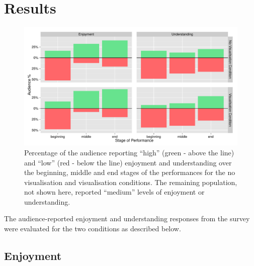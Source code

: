 \section{Results}

\begin{figure}
  \centering
  \includegraphics[width=\columnwidth]{../study-3/results/dimension-condition-study-3.pdf}
  \caption[Follow-up user study survey condition and dimension results]{Percentage of the audience reporting ``high'' (green - above
the line) and ``low'' (red - below the line) enjoyment and
understanding over the beginning, middle and end stages of the
performances for the no visualisation and visualisation conditions. The remaining
population, not shown here, reported ``medium'' levels of enjoyment or
understanding.}
  \label{fig:dimension-condition-follow-up-user-study}
\end{figure}

The audience-reported enjoyment and understanding responses from the survey were evaluated for the two conditions as described below.

\subsection{Enjoyment}

